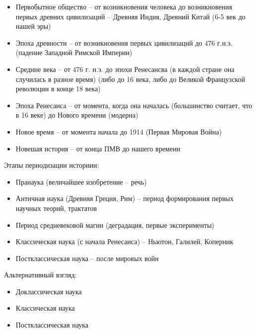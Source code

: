 \documentclass[12pt]{article}
\begin{document}
\begin{itemize}
    \item Первобытное общество -- от возникновения человека до возникновения первых древних цивилизаций -- Древняя Индия, Древний Китай (6-5 век до нашей эры)
    \item Эпоха древности -- от возникновения первых цивилизаций до 476 г.н.э. (падение Западной Римской Империи)
    \item Средние века -- от 476 г. н.э. до эпохи Ренесансва (в каждой стране она случилась в разное время) (либо до 16 века, либо до Великой Французской революции в конце 18 века)
    \item Эпоха Ренесанса -- от момента, когда она началась (большинство считает, что в 16 веке) до Нового времени (модерна)
    \item Новое время -- от момента начала до 1914 (Первая Мировая Война)
    \item Новешая история -- от конца ПМВ до нашего времени
\end{itemize}
Этапы периодизации историии:
\begin{itemize}
    \item Пранаука (величайшее изобретение -- речь)
    \item Античная наука (Древняя Греция, Рим) -- период формирования первых научных теорий, трактатов
    \item Период средневековой магии (деградация, первые эксперименты)
    \item Классическая наука (с начала Ренесанса) -- Ньютон, Галилей, Коперник
    \item Постклассическая наука -- после мировых войн
\end{itemize}
Альтернативный взгляд:
\begin{itemize}
    \item Доклассическая наука 
    \item Классическая наука
    \item Постклассическая наука
\end{itemize}
\end{document}
